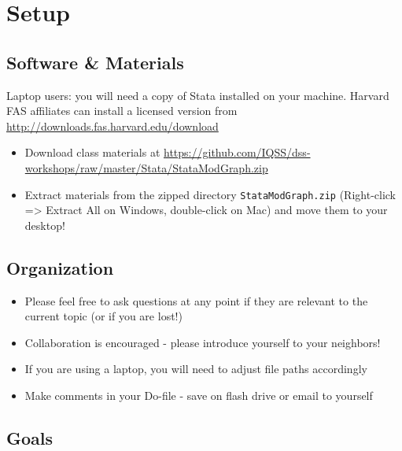 \documentclass[]{book}
\providecommand{\tightlist}{%
  \setlength{\itemsep}{0pt}\setlength{\parskip}{0pt}}
\begin{document}
\hypertarget{setup-8}{%
\section{Setup}\label{setup-8}}

\hypertarget{software-materials-2}{%
\subsection{Software \& Materials}\label{software-materials-2}}

Laptop users: you will need a copy of Stata installed on your machine.
Harvard FAS affiliates can install a licensed version from \url{http://downloads.fas.harvard.edu/download}

\begin{itemize}
\tightlist
\item
  Download class materials at \url{https://github.com/IQSS/dss-workshops/raw/master/Stata/StataModGraph.zip}
\item
  Extract materials from the zipped directory \texttt{StataModGraph.zip} (Right-click =\textgreater{} Extract All on Windows, double-click on Mac) and move them to your desktop!
\end{itemize}

\hypertarget{organization-2}{%
\subsection{Organization}\label{organization-2}}

\begin{itemize}
\tightlist
\item
  Please feel free to ask questions at any point if they are relevant to the current topic (or if you are lost!)
\item
  Collaboration is encouraged - please introduce yourself to your neighbors!
\item
  If you are using a laptop, you will need to adjust file paths accordingly
\item
  Make comments in your Do-file - save on flash drive or email to yourself
\end{itemize}

\hypertarget{goals-7}{%
\subsection{Goals}\label{goals-7}}
\end{document}
